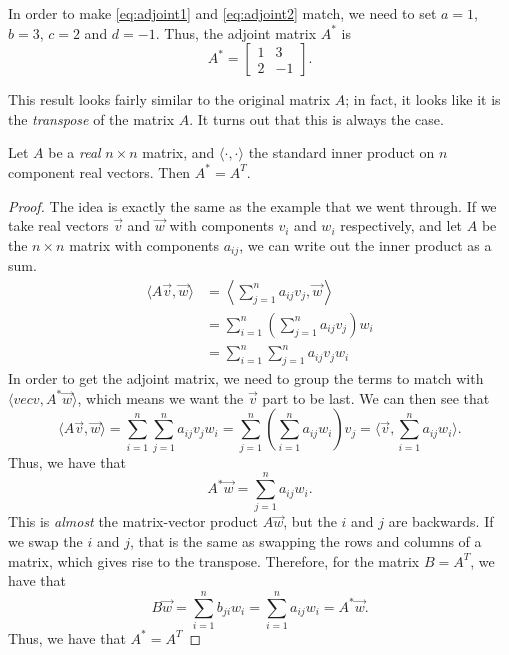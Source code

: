 \documentclass{ximera}
\begin{document}
\begin{exampleSol}
    In order to make \eqref{eq:adjoint1} and \eqref{eq:adjoint2} match, we need to set $a=1$, $b=3$, $c=2$ and $d=-1$. Thus, the adjoint matrix $A^*$ is
    \[ 
        A^* = 
        \begin{bmatrix} 
            1 & 3 \\ 
            2 & -1 
        \end{bmatrix}. 
    \]
\end{exampleSol}

This result looks fairly similar to the original matrix $A$; in fact, it looks like it is the \emph{transpose} of the matrix $A$. It turns out that this is always the case.

\begin{theorem}{}
    Let $A$ be a \emph{real} $n \times n$ matrix, and $\langle \cdot, \cdot \rangle$ the standard inner product on $n$ component real vectors. Then $A^* = A^T$. 
\end{theorem}

\begin{proof}
    The idea is exactly the same as the example that we went through. If we take real vectors $\vec{v}$ and $\vec{w}$ with components $v_i$ and $w_i$ respectively, and let $A$ be the $n \times n$ matrix with components $a_{ij}$, we can write out the inner product as a sum.
    \[
        \begin{split}
            \langle A\vec{v}, \vec{w} \rangle &= \left\langle \sum_{j=1}^n a_{ij}v_j, \vec{w} \right\rangle \\
            &= \sum_{i=1}^n \left(\sum_{j=1}^n a_{ij}v_j \right)w_i \\
            &= \sum_{i=1}^n \sum_{j=1}^n a_{ij}v_jw_i
        \end{split}
    \]
    In order to get the adjoint matrix, we need to group the terms to match with $\langle vec{v}, A^*\vec{w} \rangle$, which means we want the $\vec{v}$ part to be last. We can then see that
    \[ 
        \langle A \vec{v}, \vec{w} \rangle = \sum_{i=1}^n \sum_{j=1}^n a_{ij}v_jw_i = \sum_{j=1}^n \left( \sum_{i=1}^n a_{ij}w_i \right) v_j = \langle \vec{v}, \sum_{i=1}^n a_{ij}w_i \rangle.  
    \]
    Thus, we have that
    \[ 
        A^*\vec{w} = \sum_{j=1}^n a_{ij}w_i . 
    \]
    This is \emph{almost} the matrix-vector product $A\vec{w}$, but the $i$ and $j$ are backwards. If we swap the $i$ and $j$, that is the same as swapping the rows and columns of a matrix, which gives rise to the transpose. Therefore, for the matrix $B = A^T$, we have that
    \[ 
        B\vec{w} = \sum_{i=1}^n b_{ji}w_i = \sum_{i=1}^n a_{ij}w_i = A^*\vec{w}.
    \]
    Thus, we have that $A^* = A^T$
\end{proof}
\end{document}
